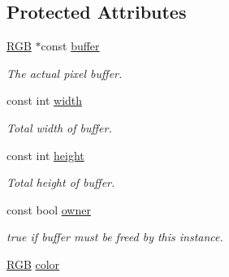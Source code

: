 \subsection*{Protected Attributes}
\begin{DoxyCompactItemize}
\item 
\hypertarget{classGUI_1_1Drawable_a727ae1037135abcd7aa0309b39215320}{\hyperlink{namespaceGUI_aeafd135255365f3584da0e982fc79466}{R\-G\-B} $\ast$const \hyperlink{classGUI_1_1Drawable_a727ae1037135abcd7aa0309b39215320}{buffer}}\label{classGUI_1_1Drawable_a727ae1037135abcd7aa0309b39215320}

\begin{DoxyCompactList}\small\item\em The actual pixel buffer. \end{DoxyCompactList}\item 
\hypertarget{classGUI_1_1Drawable_a494b6f1edafb1d03279b43b244883a1e}{const int \hyperlink{classGUI_1_1Drawable_a494b6f1edafb1d03279b43b244883a1e}{width}}\label{classGUI_1_1Drawable_a494b6f1edafb1d03279b43b244883a1e}

\begin{DoxyCompactList}\small\item\em Total width of buffer. \end{DoxyCompactList}\item 
\hypertarget{classGUI_1_1Drawable_a02b7ebcd21396c6de9ee229193540df7}{const int \hyperlink{classGUI_1_1Drawable_a02b7ebcd21396c6de9ee229193540df7}{height}}\label{classGUI_1_1Drawable_a02b7ebcd21396c6de9ee229193540df7}

\begin{DoxyCompactList}\small\item\em Total height of buffer. \end{DoxyCompactList}\item 
\hypertarget{classGUI_1_1Drawable_a2602c5a354a8aec3362a29272ff15367}{const bool \hyperlink{classGUI_1_1Drawable_a2602c5a354a8aec3362a29272ff15367}{owner}}\label{classGUI_1_1Drawable_a2602c5a354a8aec3362a29272ff15367}

\begin{DoxyCompactList}\small\item\em {\ttfamily true} if {\itshape buffer\/} must be freed by this instance. \end{DoxyCompactList}\item 
\hypertarget{classGUI_1_1Drawable_a4baae1e13505d45245c49244703217d7}{\hyperlink{namespaceGUI_aeafd135255365f3584da0e982fc79466}{R\-G\-B} \hyperlink{classGUI_1_1Drawable_a4baae1e13505d45245c49244703217d7}{color}}\label{classGUI_1_1Drawable_a4baae1e13505d45245c49244703217d7}


\end{DoxyCompactItemize}
